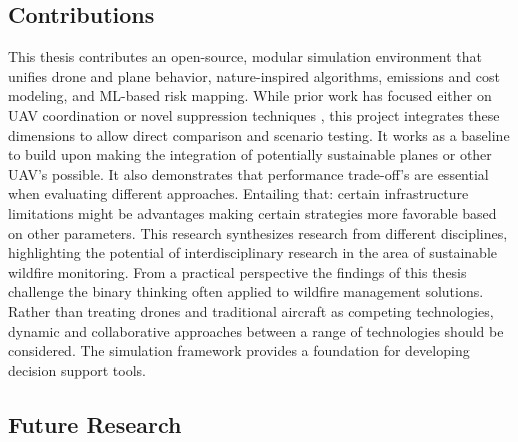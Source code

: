 \documentclass[11pt, a4paper]{article}
\begin{document}
\subsection{Contributions}

This thesis contributes an open-source, modular simulation environment that unifies drone and plane behavior, nature-inspired algorithms, emissions and cost modeling, and ML-based risk mapping. While prior work has focused either on UAV coordination \cite{Afghah2019} or novel suppression techniques \cite{fireBalls}, this project integrates these dimensions to allow direct comparison and scenario testing. It works as a baseline to build upon making the integration of potentially sustainable planes or other UAV's possible. It also demonstrates that performance trade-off's are essential when evaluating different approaches. Entailing that: certain infrastructure limitations might be advantages making certain strategies more favorable based on other parameters. This research synthesizes research from different disciplines, highlighting the potential of interdisciplinary research in the area of sustainable wildfire monitoring.
From a practical perspective the findings of this thesis challenge the binary thinking often applied to wildfire management solutions. Rather than treating drones and traditional aircraft as competing technologies, dynamic and collaborative approaches between a range of technologies should be considered.
The simulation framework provides a foundation for developing decision support tools.


\subsection{Future Research}
\end{document}
